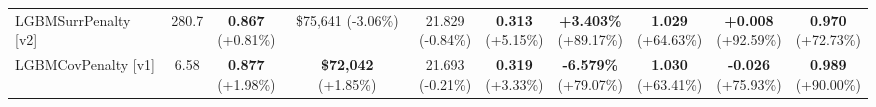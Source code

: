 \documentclass[12pt, draft]{article}
\theoremstyle{plain}
\theoremstyle{definition}
\newcommand{\1}{\mathbf{1}}
\begin{document}
\begin{table}[htbp]
{\begin{tabular}{lc|cc|cc|cccc}
    LGBMSurrPenalty [v2] & 280.7 &
    \makecell{\textbf{0.867}\\{\scriptsize(\textcolor{green!60!black}{+0.81\%})}} &
    \makecell{\$75,641\\{\scriptsize(\textcolor{red!70!black}{-3.06\%})}} &
    \makecell{21.829\\{\scriptsize(\textcolor{red!70!black}{-0.84\%})}} &
    \makecell{\textbf{0.313}\\{\scriptsize(\textcolor{green!60!black}{+5.15\%})}} &
    \makecell{\textbf{+3.403\%}\\{\scriptsize(\textcolor{green!60!black}{+89.17\%})}} &
    \makecell{\textbf{1.029}\\{\scriptsize(\textcolor{green!60!black}{+64.63\%})}} &
    \makecell{\textbf{+0.008}\\{\scriptsize(\textcolor{green!60!black}{+92.59\%})}} &
    \makecell{\textbf{0.970}\\{\scriptsize(\textcolor{green!60!black}{+72.73\%})}} \\
    [1.5mm]
    
    LGBMCovPenalty [v1] & 6.58 &
    \makecell{\textbf{0.877}\\{\scriptsize(\textcolor{green!60!black}{+1.98\%})}} &
    \makecell{\textbf{\$72,042}\\{\scriptsize(\textcolor{green!60!black}{+1.85\%})}} &
    \makecell{21.693\\{\scriptsize(\textcolor{red!70!black}{-0.21\%})}} &
    \makecell{\textbf{0.319}\\{\scriptsize(\textcolor{green!60!black}{+3.33\%})}} &
    \makecell{\textbf{-6.579\%}\\{\scriptsize(\textcolor{green!60!black}{+79.07\%})}} &
    \makecell{\textbf{1.030}\\{\scriptsize(\textcolor{green!60!black}{+63.41\%})}} &
    \makecell{\textbf{-0.026}\\{\scriptsize(\textcolor{green!60!black}{+75.93\%})}} &
    \makecell{\textbf{0.989}\\{\scriptsize(\textcolor{green!60!black}{+90.00\%})}} \\
    [1.5mm]
    

\end{tabular}}
\end{table}
\end{document}
